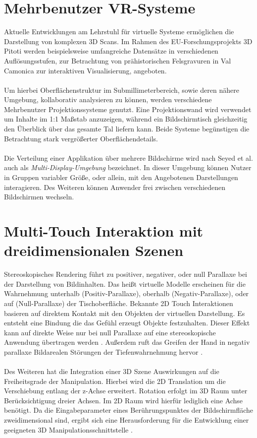 \section{Mehrbenutzer VR-Systeme}
\label{sec:mehrbenutzer_vr_systeme}

Aktuelle Entwicklungen am Lehrstuhl für virtuelle Systeme ermöglichen die Darstellung von komplexen 3D Scans. Im Rahmen des EU-Forschungsprojekts 3D Pitoti werden beispielsweise umfangreiche Datensätze in verschiedenen Auflösungsstufen, zur Betrachtung von prähistorischen Felsgravuren in Val Camonica zur interaktiven Visualisierung, angeboten. 
\\\\
Um hierbei Oberflächenstruktur im Submillimeterbereich, sowie deren nähere Umgebung, kollaborativ analysieren zu können, werden verschiedene Mehrbenutzer Projektionssysteme genutzt. Eine Projektionswand wird verwendet um Inhalte im 1:1 Maßstab anzuzeigen, während ein Bildschirmtisch gleichzeitig den Überblick über das gesamte Tal liefern kann. Beide Systeme begünstigen die Betrachtung stark vergrößerter Oberflächendetails.
\\\\
Die Verteilung einer Applikation über mehrere Bildschirme wird nach Seyed et al. \cite{seyed:2013} auch als \emph{Multi-Display-Umgebung} bezeichnet. In dieser Umgebung können Nutzer in Gruppen variabler Größe, oder allein, mit den Angebotenen Darstellungen interagieren. Des Weiteren können Anwender frei zwischen verschiedenen Bildschirmen wechseln.


\section{Multi-Touch Interaktion mit dreidimensionalen Szenen}
\label{sec:multi_touch_interaktion_mit_3d_szenen}

Stereoskopisches Rendering führt zu positiver, negativer, oder null Parallaxe bei der Darstellung von Bildinhalten. Das heißt virtuelle Modelle erscheinen für die Wahrnehmung unterhalb (Positiv-Parallaxe), oberhalb (Negativ-Parallaxe), oder auf (Null-Parallaxe) der Tischoberfläche. Bekannte 2D Touch Interaktionen basieren auf direktem Kontakt mit den Objekten der virtuellen Darstellung. Es entsteht eine Bindung die das Gefühl erzeugt Objekte festzuhalten. Dieser Effekt kann auf direkte Weise nur bei null Parallaxe auf eine stereoskopische Anwendung übertragen werden \cite{bruder:2013}. Außerdem ruft das Greifen der Hand in negativ parallaxe Bildarealen Störungen der Tiefenwahrnehmung hervor \cite{delariviere:2010}.
\\\\
Des Weiteren hat die Integration einer 3D Szene Auswirkungen auf die Freiheitsgrade der Manipulation. Hierbei wird die 2D Translation um die Verschiebung entlang der z-Achse erweitert. Rotation erfolgt im 3D Raum unter Berücksichtigung dreier Achsen. Im 2D Raum wird hierfür lediglich eine Achse benötigt. Da die Eingabeparameter eines Berührungspunktes der Bildschirmfläche zweidimensional sind, ergibt sich eine Herausforderung für die Entwicklung einer geeigneten 3D Manipulationsschnittstelle \cite{martinet:2012}.


